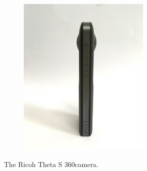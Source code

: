 \begin{figure}
\begin{subfigure}{0.3\textwidth}
		\centering
		\includegraphics[width=0.7\textwidth]{img/theta3}
	\end{subfigure}
	\caption{\label{fig:ricoh_theta}The Ricoh Theta S 360\degree camera.}
\end{figure}
